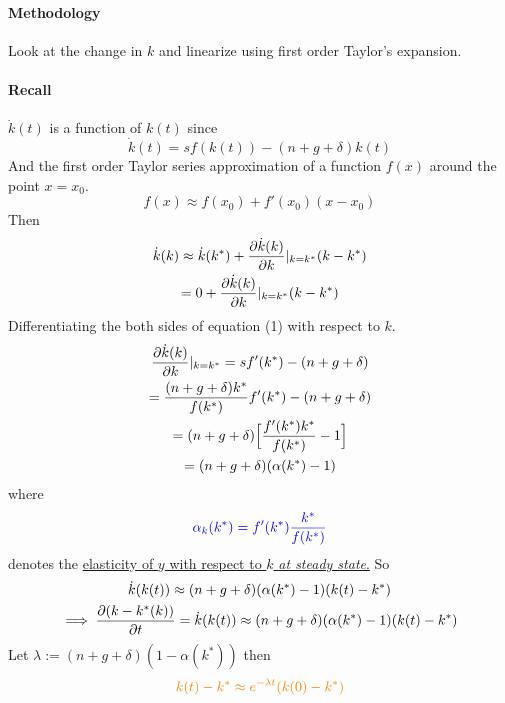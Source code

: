 \documentclass[]{article}
\begin{document}
	    \paragraph{Methodology} Look at the change in $k$ and linearize using first order Taylor's expansion.
	    \paragraph{Recall} $\dot{k}(t)$ is a function of $k(t)$ since 
	    \begin{equation}
	        \dot{k}(t) = sf(k(t)) - (n+g+\delta)k(t)
	    \end{equation}
	    And the first order Taylor series approximation of a function $f(x)$ around the point $x = x_0$.
	    \[
	        f(x) \approx f(x_0) + f'(x_0)(x - x_0)
	    \]
	    Then
	    \begin{gather*}
	        \dot{k}(k) \approx \dot{k}(k^*) + \frac{\partial{\dot{k}(k)}}{\partial{k}}|_{k=k^*} (k - k^*) \\
	        = 0 + \frac{\partial{\dot{k}(k)}}{\partial{k}}|_{k=k^*} (k - k^*)
	    \end{gather*}
	    Differentiating the both sides of equation (1) with respect to $k$.
	    \begin{gather*}
	        \frac{\partial{\dot{k}(k)}}{\partial{k}}|_{k=k^*} = sf'(k^*) - (n + g + \delta) \\
	        = \frac{(n + g + \delta) k^*}{f(k^*)} f'(k^*) - (n + g + \delta) \\
	        = (n + g + \delta) \Big [
	            \frac{f'(k^*) k^*}{f(k^*)} - 1
	            \Big ] \\
	        = (n + g + \delta) (\alpha (k^*) - 1)
	    \end{gather*}
	    where 
	    \begin{equation}
	    \textcolor{blue}{
	        \alpha_k (k^*) = f'(k^*)\frac{k^*}{f(k^*)}
	        }
	    \end{equation}
	    denotes the \ul{elasticity of $y$ with respect to $k$ \emph{at steady state}.}
	    So
	    \begin{gather*}
	        \dot{k}(k(t)) \approx (n + g + \delta) (\alpha (k^*) - 1) (k(t) - k^*) \\
	        \implies \frac{\partial{({k - k^*}(k))}}{\partial{t}} = \dot{k}(k(t)) \approx (n + g + \delta) (\alpha (k^*) - 1) (k(t) - k^*)
	    \end{gather*}
	    Let $\lambda := (n + g + \delta) (1 - \alpha (k^*))$ then 
	    \begin{gather}
	    \textcolor{orange}{
	        k(t) - k^* \approx e^{-\lambda t}(k(0) - k^*)
	    }
	    \end{gather}
\end{document}
